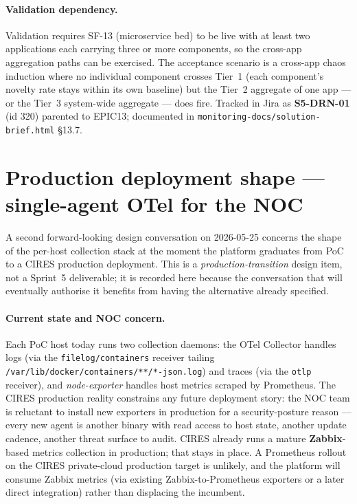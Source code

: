 \documentclass[11pt,a4paper,oneside]{report}
\begin{document}
\paragraph{Validation dependency.}
Validation requires SF-13 (microservice bed) to be live with at
least two applications each carrying three or more components,
so the cross-app aggregation paths can be exercised.  The
acceptance scenario is a cross-app chaos induction where no
individual component crosses Tier~1 (each component's novelty
rate stays within its own baseline) but the Tier~2 aggregate of
one app --- or the Tier~3 system-wide aggregate --- does fire.
Tracked in Jira as \textbf{S5-DRN-01} (id 320) parented to
EPIC13; documented in
\texttt{monitoring-docs/solution-brief.html} \S13.7.

\section{Production deployment shape --- single-agent OTel for the NOC}
\label{sec:single-agent-otel}

A second forward-looking design conversation on 2026-05-25
concerns the shape of the per-host collection stack at the
moment the platform graduates from PoC to a CIRES production
deployment. This is a \emph{production-transition} design item,
not a Sprint~5 deliverable; it is recorded here because the
conversation that will eventually authorise it benefits from
having the alternative already specified.

\paragraph{Current state and NOC concern.}
Each PoC host today runs two collection daemons: the OTel
Collector handles logs (via the \texttt{filelog/containers}
receiver tailing
\texttt{/var/lib/docker/containers/**/*-json.log}) and traces
(via the \texttt{otlp} receiver), and \emph{node-exporter}
handles host metrics scraped by Prometheus. The CIRES production
reality constrains any future deployment story: the NOC team is
reluctant to install new exporters in production for a
security-posture reason --- every new agent is another binary
with read access to host state, another update cadence, another
threat surface to audit. CIRES already runs a mature
\textbf{Zabbix}-based metrics collection in production; that
stays in place. A Prometheus rollout on the CIRES private-cloud
production target is unlikely, and the platform will consume
Zabbix metrics (via existing Zabbix-to-Prometheus exporters or
a later direct integration) rather than displacing the incumbent.
\end{document}
